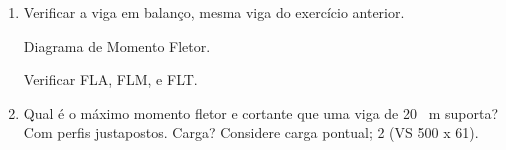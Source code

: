 \begin{enumerate}
    $I_{Tcy} = \frac{(0,8\times 25^3)+(37,17 \times 0,63^3)}{12} = 1042,44 \ cm^4$

    $A_{gt} = (8\times 25)+(63 \times 37,17) = 43,4171$

    $r_{ytc} = \sqrt{\frac{I_{Tcy}}{A_g}} = 4,9 \ cm$

    $C_b = \frac{12,5 \ M_{máx}}{2,5 M_{máx}+3M_A+4M_B+3M_C}R_m$

    $M_{max}=M_B = \frac{ql^2}{8} = \frac{11,2\ kN/m \times 10^2}{8} = 14000 \ kNcm$

    $M_A=M_C = \frac{3ql^2}{32}=\frac{qlx}{2}-\frac{qx^2}{2}=\frac{3 \times 0,112 \times 1000^2}{32} = 10500 \ kN$

    $R_m = 0,5 +2(\frac{I_{ym}}{I_y})^2 = 0,5+2(\frac{\frac{8,25^3}{12}}{3126})^2=0,72$

    $C_b = 0,82$

    $B_1 = \frac{(0,7f_y)w_c}{EJ}\leq \frac{f_yw_c}{EJ} \to B_1 = 0,0328 \leq 0,0072$

    $B_3 = 0,45 (d-\frac{t_{fs}+t_{fi}}{2})(2\alpha_y-1)=0,45(45-\frac{0,8+1,6}{2})(2\times0,33-1)=-6,70$

    $\alpha_y=\frac{I_{ytc}}{I_y}=0,33$

    $\beta_2 = \frac{5,2\beta_1\beta_3}{C_b}+1=-0,3938$

    $\lambda_r=119,63$

    $M_{cr}=11833,82$

    $M_{Rd}=\frac{1}{\gamma_{a1}}M_{cr}=10758\ kNcm$



    \newpage

    \item Verificar a viga em balanço, mesma viga do exercício anterior.
    
    

    
    
    Diagrama de Momento Fletor.

    Verificar FLA, FLM, e FLT.

    

    \newpage

    \item Qual é o máximo momento fletor e cortante que uma viga de 20 \ m suporta? Com perfis justapostos. Carga? Considere carga pontual; 2 (VS 500 x 61).

\end{enumerate}
